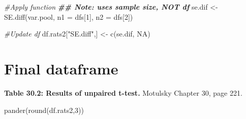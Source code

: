 \documentclass[
]{book}
\newenvironment{Shaded}{\begin{snugshade}}{\end{snugshade}}
\newcommand{\AttributeTok}[1]{\textcolor[rgb]{0.77,0.63,0.00}{#1}}
\newcommand{\CommentTok}[1]{\textcolor[rgb]{0.56,0.35,0.01}{\textit{#1}}}
\newcommand{\ConstantTok}[1]{\textcolor[rgb]{0.00,0.00,0.00}{#1}}
\newcommand{\DecValTok}[1]{\textcolor[rgb]{0.00,0.00,0.81}{#1}}
\newcommand{\DocumentationTok}[1]{\textcolor[rgb]{0.56,0.35,0.01}{\textbf{\textit{#1}}}}
\newcommand{\FunctionTok}[1]{\textcolor[rgb]{0.00,0.00,0.00}{#1}}
\newcommand{\NormalTok}[1]{#1}
\newcommand{\OtherTok}[1]{\textcolor[rgb]{0.56,0.35,0.01}{#1}}
\newcommand{\StringTok}[1]{\textcolor[rgb]{0.31,0.60,0.02}{#1}}
\begin{document}
\begin{Shaded}
\begin{Highlighting}[]
\CommentTok{\#Apply function}
\DocumentationTok{\#\# Note: uses sample size, NOT df}
\NormalTok{se.dif }\OtherTok{\textless{}{-}} \FunctionTok{SE.diff}\NormalTok{(var.pool,}
                  \AttributeTok{n1 =}\NormalTok{ dfs[}\DecValTok{1}\NormalTok{],}
                  \AttributeTok{n2 =}\NormalTok{ dfs[}\DecValTok{2}\NormalTok{])  }
  

\CommentTok{\#Update df}
\NormalTok{df.rats2[}\StringTok{"SE.diff"}\NormalTok{,] }\OtherTok{\textless{}{-}} \FunctionTok{c}\NormalTok{(se.dif, }\ConstantTok{NA}\NormalTok{)}
\end{Highlighting}
\end{Shaded}

\hypertarget{final-dataframe}{%
\chapter{Final dataframe}\label{final-dataframe}}

\textbf{Table 30.2: Results of unpaired t-test.} Motulsky Chapter 30, page 221.

\begin{Shaded}
\begin{Highlighting}[]
\FunctionTok{pander}\NormalTok{(}\FunctionTok{round}\NormalTok{(df.rats2,}\DecValTok{3}\NormalTok{))}
\end{Highlighting}
\end{Shaded}
\end{document}
